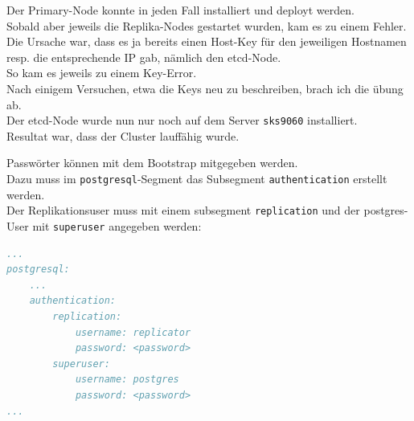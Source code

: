 \begin{flushleft}
    Der Primary-Node konnte in jeden Fall installiert und deployt werden.\\
    Sobald aber jeweils die Replika-Nodes gestartet wurden, kam es zu einem Fehler.\\
    Die Ursache war, dass es ja bereits einen Host-Key für den jeweiligen Hostnamen resp.
    die entsprechende IP gab, nämlich den \gls{etcd}-Node.\\
    So kam es jeweils zu einem Key-Error.\\
    Nach einigem Versuchen, etwa die Keys neu zu beschreiben, brach ich die übung ab.\\
    Der \gls{etcd}-Node wurde nun nur noch auf dem Server \texttt{sks9060} installiert.\\
    Resultat war, dass der Cluster lauffähig wurde.\\
\end{flushleft}
\clearpage
{}
\recalctypearea
\begin{flushleft}
    Passwörter können mit dem Bootstrap mitgegeben werden.\\
    Dazu muss im \texttt{postgresql}-Segment das Subsegment \texttt{authentication} erstellt werden.\\
    Der Replikationsuser muss mit einem subsegment \texttt{replication} und der postgres-User mit \texttt{superuser} angegeben werden:
\lstset{style=gra_codestyle}
\begin{lstlisting}[language=yaml, caption=Patroni - Passwörter,captionpos=b,label={lst:patroni_passwords},breaklines=true]
...
postgresql:
    ...
    authentication:
        replication:
            username: replicator
            password: <password>
        superuser:
            username: postgres
            password: <password>
...
\end{lstlisting}
\end{flushleft}
\clearpage
{}
\recalctypearea
